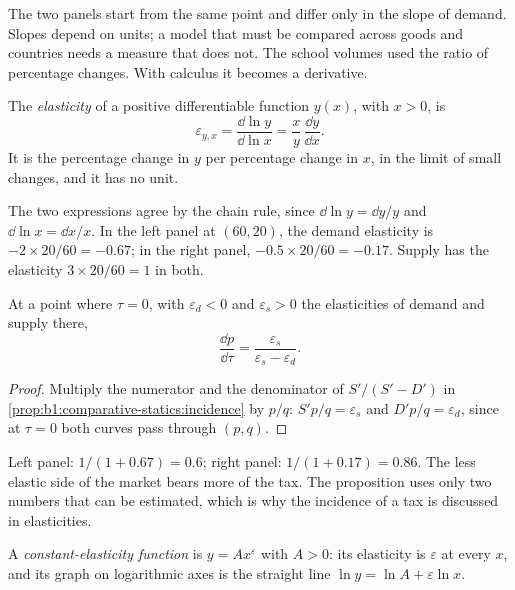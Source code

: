 The two panels start from the same point and differ only in the slope of
demand. Slopes depend on units; a model that must be compared across goods
and countries needs a measure that does not. The school volumes used the
ratio of percentage changes. With calculus it becomes a derivative.

\begin{definition}\label{def:b1:comparative-statics:point-elasticity}
The \emph{elasticity} of a positive differentiable function $y(x)$, with
$x > 0$, is
\[
\varepsilon_{y,x} = \frac{\dd\ln y}{\dd\ln x} = \frac{x}{y}\,\frac{\dd y}{\dd x}.
\]
It is the percentage change in $y$ per percentage change in $x$, in the
limit of small changes, and it has no unit.
\end{definition}

The two expressions agree by the chain rule, since $\dd\ln y = \dd y/y$ and
$\dd\ln x = \dd x/x$. In the left panel at $(60, 20)$, the demand elasticity
is $-2 \times 20/60 = -0.67$; in the right panel, $-0.5 \times 20/60 = -0.17$.
Supply has the elasticity $3 \times 20/60 = 1$ in both.

\begin{proposition}\label{prop:b1:comparative-statics:pass-through}
At a point where $\tau = 0$, with $\varepsilon_d < 0$ and $\varepsilon_s > 0$ the
elasticities of demand and supply there,
\[
\frac{\dd p}{\dd\tau} = \frac{\varepsilon_s}{\varepsilon_s - \varepsilon_d} .
\]
\end{proposition}

\begin{proof}
Multiply the numerator and the denominator of $S'/(S' - D')$ in
\cref{prop:b1:comparative-statics:incidence} by $p/q$: $S'p/q = \varepsilon_s$
and $D'p/q = \varepsilon_d$, since at $\tau = 0$ both curves pass through $(p, q)$.
\end{proof}

Left panel: $1/(1 + 0.67) = 0.6$; right panel: $1/(1 + 0.17) = 0.86$. The less
elastic side of the market bears more of the tax. The proposition uses only
two numbers that can be estimated, which is why the incidence of a tax is
discussed in elasticities.

\begin{definition}\label{def:b1:comparative-statics:constant-elasticity}
A \emph{constant-elasticity function} is $y = A x^{\varepsilon}$ with $A > 0$:
its elasticity is $\varepsilon$ at every $x$, and its graph on logarithmic axes
is the straight line $\ln y = \ln A + \varepsilon \ln x$.
\end{definition}

